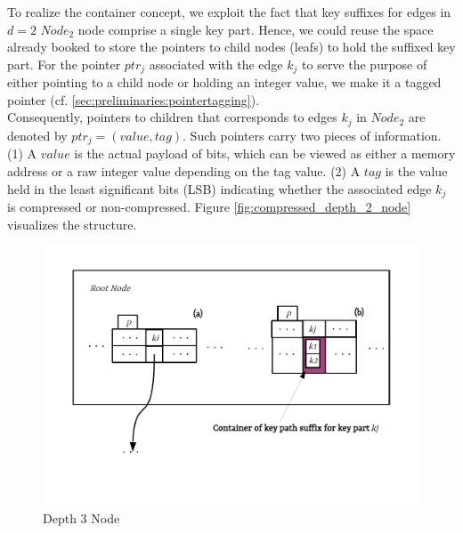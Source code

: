To realize the container concept, we exploit the fact that key suffixes for edges in $d=2$ $Node_{2}$ node comprise a single key part.
Hence, we could reuse the space already booked to store the pointers to child nodes (leafs) to hold the suffixed key part.
For the pointer $ptr_{j}$ associated with the edge $k_{j}$ to serve the purpose of either pointing to a child node or holding an integer value, we make it a tagged pointer (cf. \ref{sec:preliminaries:pointertagging}). \\

Consequently, pointers to children that corresponds to edges $k_{j}$ in $Node_{2}$ are denoted by $ptr_{j} = (value, tag)$. Such pointers carry two pieces of information. (1) A $value$ is the actual payload of bits, which can be viewed as either a memory address or a raw integer value depending on the tag value. (2) A $tag$ is the value held in the least significant bits (LSB) indicating whether the associated edge $k_{j}$ is compressed or non-compressed. Figure \ref{fig:compressed_depth_2_node} visualizes the structure.


\begin{figure}
	\centering
	\vspace{-0.3in}
	\includegraphics{figures/chapter4/depth3}
	\caption{Depth 3 Node}
	\label{fig:compressed_depth_3_node}
\end{figure}


